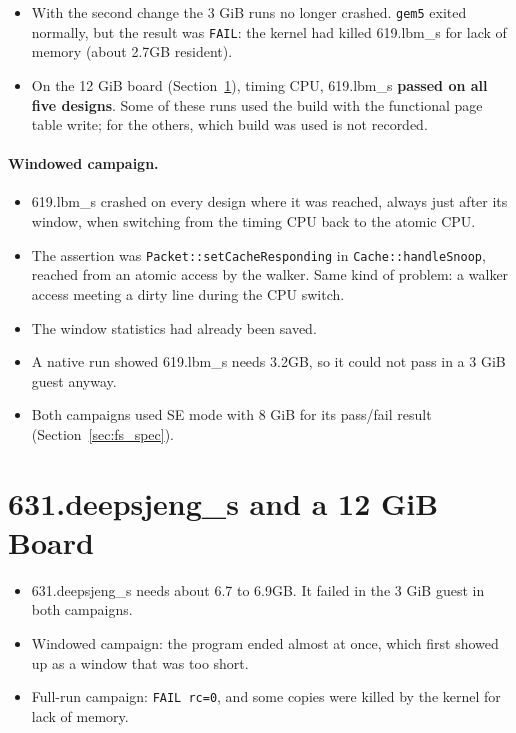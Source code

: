 \begin{itemize}
    \item With the second change the 3 GiB runs no longer crashed. \texttt{gem5} exited normally, but the result was \texttt{FAIL}: the kernel had killed 619.lbm\_s for lack of memory (about 2.7GB resident).
    \item On the 12 GiB board (Section~\ref{sec:chr_mem}), timing CPU, 619.lbm\_s \textbf{passed on all five designs}. Some of these runs used the build with the functional page table write; for the others, which build was used is not recorded.
\end{itemize}

\paragraph{Windowed campaign.}
\begin{itemize}
    \item 619.lbm\_s crashed on every design where it was reached, always just after its window, when switching from the timing CPU back to the atomic CPU.
    \item The assertion was \texttt{Packet::setCacheResponding} in \texttt{Cache::handleSnoop}, reached from an atomic access by the walker. Same kind of problem: a walker access meeting a dirty line during the CPU switch.
    \item The window statistics had already been saved.
    \item A native run showed 619.lbm\_s needs 3.2GB, so it could not pass in a 3 GiB guest anyway.
    \item Both campaigns used SE mode with 8 GiB for its pass/fail result (Section~\ref{sec:fs_spec}).
\end{itemize}

\section{631.deepsjeng\_s and a 12 GiB Board}
\label{sec:chr_mem}

\begin{itemize}
    \item 631.deepsjeng\_s needs about 6.7 to 6.9GB. It failed in the 3 GiB guest in both campaigns.
    \item Windowed campaign: the program ended almost at once, which first showed up as a window that was too short.
    \item Full-run campaign: \texttt{FAIL rc=0}, and some copies were killed by the kernel for lack of memory.
\end{itemize}

